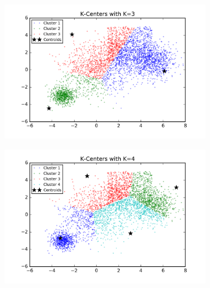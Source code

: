 \begin{figure}[htb]
        \centering
        \begin{subfigure}[b]{0.475\textwidth}
            \centering
            \includegraphics[width=\textwidth]{./figures/bigClustering_kCenter_3.png}
        \end{subfigure}
        \hfill
        \begin{subfigure}[b]{0.475\textwidth}  
            \centering 
            \includegraphics[width=\textwidth]{./figures/bigClustering_kCenter_4.png}
        \end{subfigure}
        \begin{subfigure}[b]{0.475\textwidth}  
            \centering 

\end{subfigure}
\end{figure}
